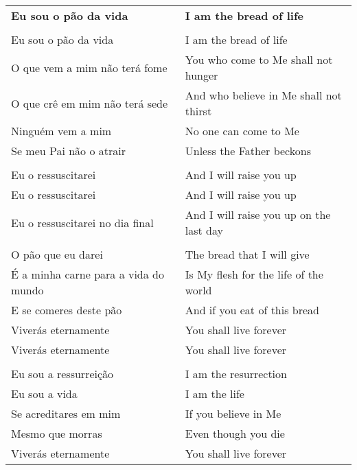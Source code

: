 \begin{longtable}{L{1.7in}R{1.7in}}
  {\bf Eu sou o pão da vida} & {\bf I am the bread of life}\\
  & \\
  Eu sou o pão da vida&I am the bread of life\\
  O que vem a mim não terá fome&You who come to Me shall not hunger\\
  O que crê em mim não terá sede&And who believe in Me shall not thirst\\
  Ninguém vem a mim&No one can come to Me\\
  Se meu Pai não o atrair&Unless the Father beckons\\
  &\\
  Eu o ressuscitarei& {And I will raise you up}\\
  Eu o ressuscitarei& {And I will raise you up}\\
  Eu o ressuscitarei no dia final& {And I will raise you up on the last day}\\
 & \\
  O pão que eu darei& The bread that I will give\\
  É a minha carne para a vida do mundo& Is My flesh for the life of the world\\
  E se comeres deste pão& And if you eat of this bread\\
  Viverás eternamente& You shall live forever\\
  Viverás eternamente& You shall live forever\\
  & \\
  Eu sou a ressurreição& I am the resurrection\\
  Eu sou a vida& I am the life\\
  Se acreditares em mim& If you believe in Me\\
  Mesmo que morras& Even though you die\\
  Viverás eternamente& You shall live forever\\
\end{longtable}

\newpage

\centering
{}


